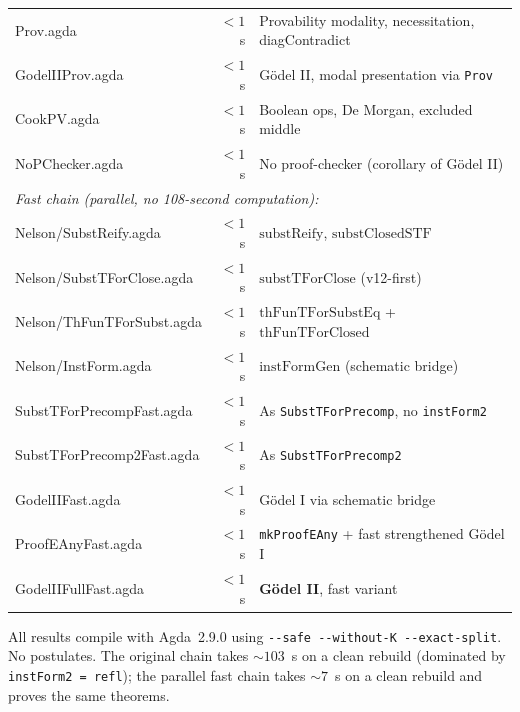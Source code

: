 \documentclass[11pt]{article}
\begin{document}
\begin{center}
\begin{tabular}{lrl}
Prov.agda & $<1$s & Provability modality, necessitation, diagContradict \\
GodelIIProv.agda & $<1$s & G\"odel II, modal presentation via \texttt{Prov} \\
CookPV.agda & $<1$s & Boolean ops, De Morgan, excluded middle \\
NoPChecker.agda & $<1$s & No proof-checker (corollary of G\"odel II) \\
\hline
\multicolumn{3}{l}{\emph{Fast chain (parallel, no 108-second computation):}} \\
\hline
Nelson/SubstReify.agda & $<1$s & $\mathrm{substReify}$, $\mathrm{substClosedSTF}$ \\
Nelson/SubstTForClose.agda & $<1$s & $\mathrm{substTForClose}$ (v12-first) \\
Nelson/ThFunTForSubst.agda & $<1$s & $\mathrm{thFunTForSubstEq}$ + $\mathrm{thFunTForClosed}$ \\
Nelson/InstForm.agda & $<1$s & $\mathrm{instFormGen}$ (schematic bridge) \\
SubstTForPrecompFast.agda & $<1$s & As \texttt{SubstTForPrecomp}, no \texttt{instForm2} \\
SubstTForPrecomp2Fast.agda & $<1$s & As \texttt{SubstTForPrecomp2} \\
GodelIIFast.agda & $<1$s & G\"odel I via schematic bridge \\
ProofEAnyFast.agda & $<1$s & \texttt{mkProofEAny} + fast strengthened G\"odel I \\
GodelIIFullFast.agda & $<1$s & \textbf{G\"odel II}, fast variant \\
\hline
\end{tabular}
\end{center}

All results compile with Agda~2.9.0 using
\texttt{-{}-safe -{}-without-K -{}-exact-split}.
No postulates.  The original chain takes ${\sim}103$~s on a clean
rebuild (dominated by \texttt{instForm2 = refl}); the parallel
fast chain takes ${\sim}7$~s on a clean rebuild and proves the
same theorems.
\end{document}
